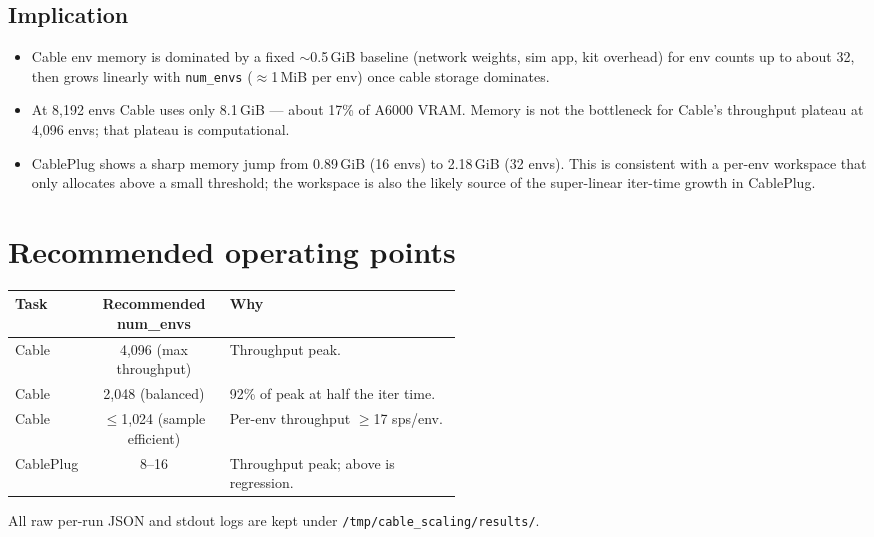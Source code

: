 \documentclass[a4paper,11pt]{article}
\newenvironment{reporttable}{%
  \vspace{0.35em}%
  \begin{center}%
  \small
  \renewcommand{\arraystretch}{1.3}%
  \setlength{\tabcolsep}{11pt}%
}{%
  \end{center}%
  \vspace{0.55em}%
}
\begin{document}
\subsection{Implication}

\begin{itemize}[leftmargin=1.4em, itemsep=0.25em]
  \item Cable env memory is dominated by a fixed $\sim$0.5\,GiB baseline (network weights, sim app, kit
        overhead) for env counts up to about 32, then grows linearly with \texttt{num\_envs}
        ($\approx$1\,MiB per env) once cable storage dominates.
  \item At 8{,}192 envs Cable uses only 8.1\,GiB --- about 17\% of A6000 VRAM. Memory is not the
        bottleneck for Cable's throughput plateau at 4{,}096 envs; that plateau is computational.
  \item CablePlug shows a sharp memory jump from 0.89\,GiB (16 envs) to 2.18\,GiB (32 envs). This is
        consistent with a per-env workspace that only allocates above a small threshold; the workspace is
        also the likely source of the super-linear iter-time growth in CablePlug.
\end{itemize}

\section{Recommended operating points}

\begin{reporttable}
\begin{tabular}{@{}l c p{0.52\linewidth}@{}}
\toprule
\textbf{Task} & \textbf{Recommended num\_envs} & \textbf{Why} \\
\midrule
Cable     & 4{,}096 (max throughput) & Throughput peak. \\
Cable     & 2{,}048 (balanced)       & 92\% of peak at half the iter time. \\
Cable     & $\leq$1{,}024 (sample efficient) & Per-env throughput $\geq$17 sps/env. \\
CablePlug & 8--16                    & Throughput peak; above is regression. \\
\bottomrule
\end{tabular}
\end{reporttable}

\vspace{0.8em}
{\small\color{ReportMuted}%
All raw per-run JSON and stdout logs are kept under \texttt{/tmp/cable\_scaling/results/}.}
\end{document}
